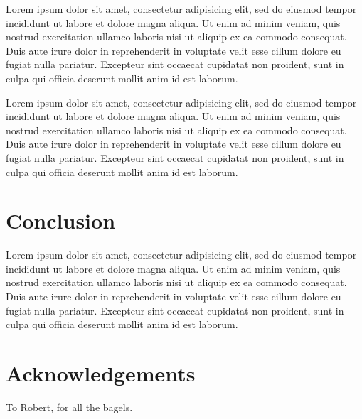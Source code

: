 \documentclass[review]{acmsiggraph}
\begin{document}
Lorem ipsum dolor sit amet, consectetur adipisicing elit, sed do
eiusmod tempor incididunt ut labore et dolore magna aliqua. Ut enim ad
minim veniam, quis nostrud exercitation ullamco laboris nisi ut
aliquip ex ea commodo consequat. Duis aute irure dolor in
reprehenderit in voluptate velit esse cillum dolore eu fugiat nulla
pariatur. Excepteur sint occaecat cupidatat non proident, sunt in
culpa qui officia deserunt mollit anim id est laborum.

Lorem ipsum dolor sit amet, consectetur adipisicing elit, sed do
eiusmod tempor incididunt ut labore et dolore magna aliqua. Ut enim ad
minim veniam, quis nostrud exercitation ullamco laboris nisi ut
aliquip ex ea commodo consequat. Duis aute irure dolor in
reprehenderit in voluptate velit esse cillum dolore eu fugiat nulla
pariatur. Excepteur sint occaecat cupidatat non proident, sunt in
culpa qui officia deserunt mollit anim id est laborum.

\section{Conclusion}

Lorem ipsum dolor sit amet, consectetur adipisicing elit, sed do
eiusmod tempor incididunt ut labore et dolore magna aliqua. Ut enim ad
minim veniam, quis nostrud exercitation ullamco laboris nisi ut
aliquip ex ea commodo consequat. Duis aute irure dolor in
reprehenderit in voluptate velit esse cillum dolore eu fugiat nulla
pariatur. Excepteur sint occaecat cupidatat non proident, sunt in
culpa qui officia deserunt mollit anim id est laborum.

\section*{Acknowledgements}

To Robert, for all the bagels.




\end{document}
